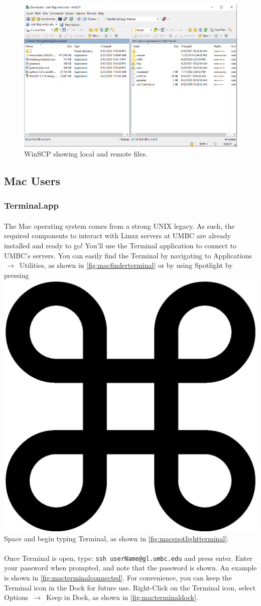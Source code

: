 \documentclass[letter,11pt]{article}
\begin{document}
\begin{figure}
\centering
\includegraphics[scale=0.6]{Images/winscp_connected.png}
\caption{WinSCP showing local and remote files.}
\label{fig:winscpconnected}
\end{figure}

\FloatBarrier
\subsection{Mac Users}
\subsubsection{Terminal.app}
\paragraph{}The Mac operating system comes from a strong UNIX legacy. As such, the required components to interact with Linux servers at UMBC are already installed and ready to go! You'll use the Terminal application to connect to UMBC's servers. You can easily find the Terminal by navigating to Applications $\,\to\,$ Utilities, as shown in \autoref{fig:macfinderterminal} or by using Spotlight by pressing \includegraphics[height=.75em]{Images/command.eps} Space and begin typing Terminal, as shown in \autoref{fig:macspotlightterminal}.

\paragraph{}Once Terminal is open, type: \texttt{ssh userName@gl.umbc.edu} and press enter. Enter your password when prompted, and note that the password is shown. An example is shown in \autoref{fig:macterminalconnected}. For convenience, you can keep the Terminal icon in the Dock for future use. Right-Click on the Terminal icon, select Options $\,\to\,$ Keep in Dock, as shown in \autoref{fig:macterminaldock}.
\end{document}
